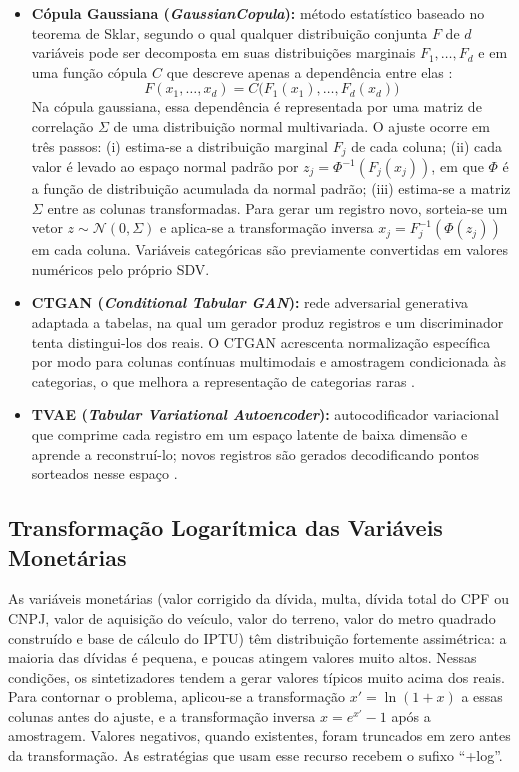 \begin{itemize}
    \item \textbf{Cópula Gaussiana (\textit{GaussianCopula}):} método estatístico baseado no teorema de Sklar, segundo o qual qualquer distribuição conjunta $F$ de $d$ variáveis pode ser decomposta em suas distribuições marginais $F_1, \dots, F_d$ e em uma função cópula $C$ que descreve apenas a dependência entre elas \cite{sklar1959fonctions}:
    \begin{equation}
        F(x_1, \dots, x_d) = C\big(F_1(x_1), \dots, F_d(x_d)\big)
    \end{equation}
    Na cópula gaussiana, essa dependência é representada por uma matriz de correlação $\Sigma$ de uma distribuição normal multivariada. O ajuste ocorre em três passos: (i) estima-se a distribuição marginal $F_j$ de cada coluna; (ii) cada valor é levado ao espaço normal padrão por $z_j = \Phi^{-1}(F_j(x_j))$, em que $\Phi$ é a função de distribuição acumulada da normal padrão; (iii) estima-se a matriz $\Sigma$ entre as colunas transformadas. Para gerar um registro novo, sorteia-se um vetor $z \sim \mathcal{N}(0, \Sigma)$ e aplica-se a transformação inversa $x_j = F_j^{-1}(\Phi(z_j))$ em cada coluna. Variáveis categóricas são previamente convertidas em valores numéricos pelo próprio SDV.
    \item \textbf{CTGAN (\textit{Conditional Tabular GAN}):} rede adversarial generativa adaptada a tabelas, na qual um gerador produz registros e um discriminador tenta distingui-los dos reais. O CTGAN acrescenta normalização específica por modo para colunas contínuas multimodais e amostragem condicionada às categorias, o que melhora a representação de categorias raras \cite{xuModelingTabularData2019}.
    \item \textbf{TVAE (\textit{Tabular Variational Autoencoder}):} autocodificador variacional que comprime cada registro em um espaço latente de baixa dimensão e aprende a reconstruí-lo; novos registros são gerados decodificando pontos sorteados nesse espaço \cite{xuModelingTabularData2019}.
\end{itemize}

\subsection{Transformação Logarítmica das Variáveis Monetárias}

As variáveis monetárias (valor corrigido da dívida, multa, dívida total do CPF ou CNPJ, valor de aquisição do veículo, valor do terreno, valor do metro quadrado construído e base de cálculo do IPTU) têm distribuição fortemente assimétrica: a maioria das dívidas é pequena, e poucas atingem valores muito altos. Nessas condições, os sintetizadores tendem a gerar valores típicos muito acima dos reais. Para contornar o problema, aplicou-se a transformação $x' = \ln(1 + x)$ a essas colunas antes do ajuste, e a transformação inversa $x = e^{x'} - 1$ após a amostragem. Valores negativos, quando existentes, foram truncados em zero antes da transformação. As estratégias que usam esse recurso recebem o sufixo ``+log''.

